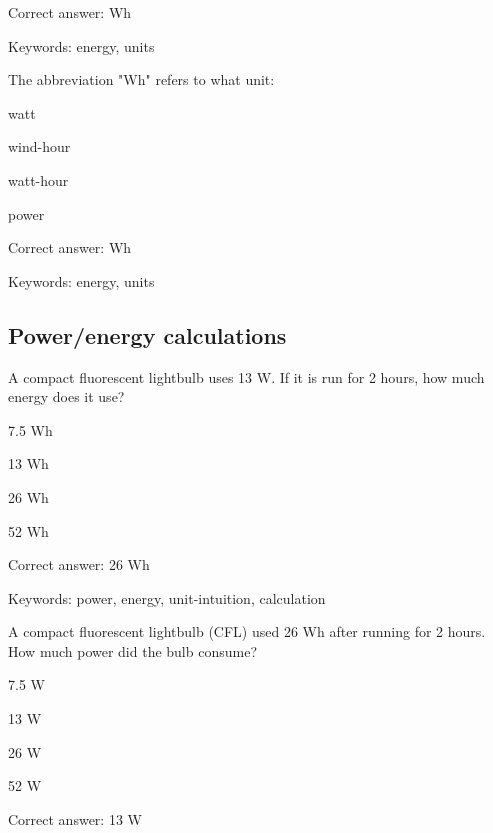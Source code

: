 Correct answer: Wh

Keywords: energy, units

\begin{question}
	\item The abbreviation "Wh" refers to what unit:
\end{question}

\begin{answer}
	\item watt
	\item wind-hour
	\item watt-hour
	\item power
\end{answer}

Correct answer: Wh

Keywords: energy, units

\subsection{Power/energy calculations}

\begin{question}
	\item A compact fluorescent lightbulb uses 13 W. If it is run for 2 hours, how much energy does it use?
\end{question}

\begin{answer}
	\item 7.5 Wh
	\item 13 Wh
	\item 26 Wh
	\item 52 Wh
\end{answer}

Correct answer: 26 Wh

Keywords: power, energy, unit-intuition, calculation

\begin{question}
	\item A compact fluorescent lightbulb (CFL) used 26 Wh after running for 2 hours. How much power did the bulb consume?
\end{question}

\begin{answer}
	\item 7.5 W
	\item 13 W
	\item 26 W
	\item 52 W
\end{answer}

Correct answer: 13 W


